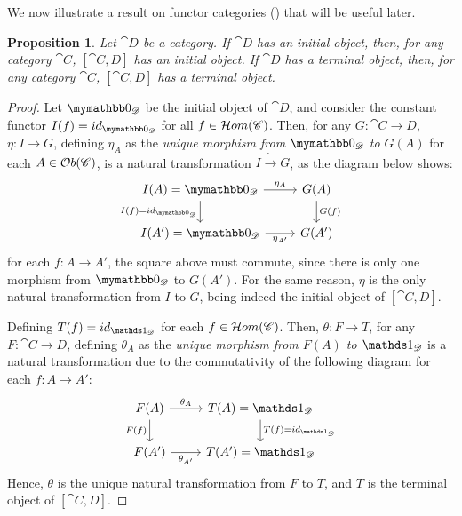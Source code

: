 \documentclass[a4paper, twoside,openright]{report}
\theoremstyle{plain}
\newtheorem{prop}[theorem]{Proposition}
\theoremstyle{definition}
\begin{document}
We now illustrate a result on functor categories () that will be useful later.

\begin{prop}
    Let $\cat D$ be a category. If $\cat D$ has an initial object, then, for any category $\cat C$, $[\cat{C, D}]$ has an initial object. If $\cat D$ has a terminal object, then, for any category $\cat C$, $[\cat{C, D}]$ has a terminal object.
\end{prop}

\begin{proof}
    Let $\initial_{\cat{D}}$ be the initial object of $\cat D$,  and consider the constant functor $I(f) = id_{\initial_{\cat D}}$ for all $f \in \mathcal{H}om(\mathscr{C})$. Then, for any $G: \cat{C \rightarrow D}$, $\eta: I \rightarrow G$, defining $\eta_A$ as the \emph{unique morphism from $\initial_{\cat D}$ to $G(A)$} for each $A \in \mathcal{O}b(\mathscr{C})$, is a natural transformation $I \dot\rightarrow G$, as the diagram below shows:
    \[
        \begin{tikzcd}
            I(A)=\initial_{\cat D} 
                    \arrow[r, "{\eta_A}"]
                    \arrow[d, "{I(f) = id_{\initial_{\cat D}}}" swap] &
            G(A)
                    \arrow[d, "G(f)"] \\
            I(A') = \initial_{\cat D}
                    \arrow[r, "{\eta_{A'}}" swap] &
            G(A')
        \end{tikzcd}
    \]
    for each $f: A \rightarrow A'$, the square above must commute, since there is only one morphism from $\initial_{\cat D}$ to $G(A')$. For the same reason, $\eta$ is the only natural transformation from $I$ to $G$, being indeed the initial object of $[\cat{C, D}]$.
    
    Defining $T(f) = id_{\terminal_{\cat D}}$ for each $f \in \mathcal{H}om(\mathscr{C})$. Then, $\theta:F\rightarrow T$, for any $F: \cat{C \rightarrow D}$, defining $\theta_A$ as the \emph{unique morphism from $F(A)$ to $\terminal_{\cat{D}}$} is a natural transformation due to the commutativity of the following diagram for each $f: A \rightarrow A'$:
    \[
        \begin{tikzcd}
            F(A) \arrow[r, "{\theta_A}"] \arrow[d, "F(f)" swap] &
            T(A) = \terminal_{\cat D} \arrow[d, "{T(f) = id_{\terminal_{\cat D}}}"] \\
            F(A') \arrow[r, "{\theta_{A'}}" swap] & T(A') = \terminal_{\cat D}
        \end{tikzcd}
    \]
    Hence, $\theta$ is the unique natural transformation from $F$ to $T$, and $T$ is the terminal object of $[\cat{C, D}]$.
\end{proof}
\end{document}
